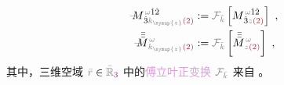 \begin{subequations} \label{eq:C}
\begin{align}
	\Xint{\mathcolor{gray}{-}}{18}{M}^{\;\! \mathcolor{gray}{\omega} \hat{1} \hat{2} }_{\;\! \hat{3} \mathcolor{gray}{k_{\symup{z}}} \textcolor{Maroon}{(2)} } &:= \mathcolor{gray}{\mathcal F_{\bar{k}}} \left[ M^{\;\! \mathcolor{gray}{\omega} \hat{1} \hat{2} }_{\;\! \hat{3} \mathcolor{gray}{z} \textcolor{Maroon}{(2)} } \right] ~, \label{eq:vec-C} \\
	\Xint{\mathcolor{gray}{-}}{18}{\bar{\bar{\bar{M}}}}^{\;\! \mathcolor{gray}{\omega} }_{\;\! \mathcolor{gray}{k_{\symup{z}}} \textcolor{Maroon}{(2)} } &:= \mathcolor{gray}{\mathcal F_{\bar{k}}} \left[ \bar{\bar{\bar{M}}}^{\;\! \mathcolor{gray}{\omega} }_{\;\! \mathcolor{gray}{z} \textcolor{Maroon}{(2)} } \right] ~, \label{eq:components-C}
\end{align}
\end{subequations}
其中，三维空域 $\mathcolor{gray}{\bar{r}} \in \mathcolor{gray}{\bar{\mathbb{R}}_{\textcolor{Plum}{3}}}$ 中的\textcolor{Plum}{傅立叶正变换} $\mathcolor{gray}{\mathcal F_{\bar{k}}}$ 来自 。

